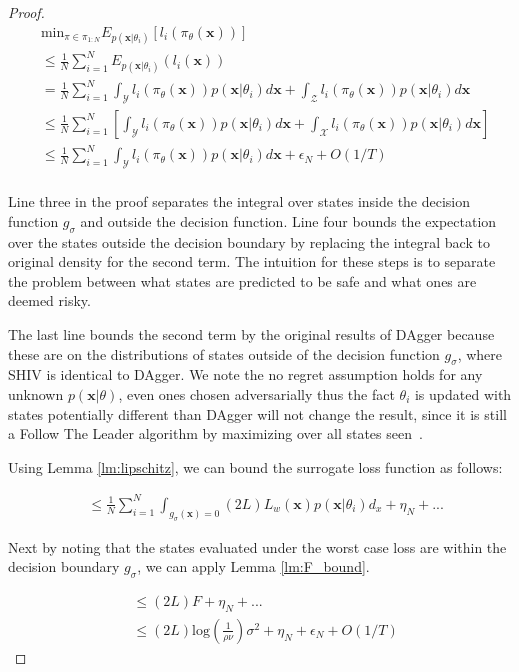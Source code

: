 \documentclass[10pt, conference]{ieeeconf}      %
\newcommand{\bx}{\mathbf{x}}
\begin{document}
\begin{proof}
\begin{align*}
&\mbox{min}_{\pi\in \pi_{1:N}} E_{p(\bx|\theta_i)}[l_i(\pi_\theta(\bx))]\\
&\leq \frac{1}{N} \sum^N_{i=1} E_{p(\bx|\theta_i)}(l_i(\bx))\\
&=\frac{1}{N} \sum^N_{i=1} \int_{\mathcal{Y}} l_i(\pi_\theta(\bx)) p(\bx|\theta_i)d\bx+\int_{\mathcal{Z}}l_i(\pi_\theta(\bx)) p(\bx|\theta_i)d\bx\\
&\leq\frac{1}{N} \sum^N_{i=1}[ \int_{\mathcal{Y}}l_i(\pi_\theta(\bx))p(\bx|\theta_i)d\bx+ \int_{\mathcal{X}} l_i(\pi_\theta(\bx))p(\bx|\theta_i)d\bx]\\
&\leq\frac{1}{N} \sum^N_{i=1} \int_{\mathcal{Y}} l_i(\pi_\theta(\bx))p(\bx|\theta_i)d\bx+  \epsilon_N + O(1/T)\\
\end{align*}

Line three in the proof separates the integral over states inside the decision function $g_{\sigma}$ and outside the decision function. Line four  bounds the expectation over the states outside the decision boundary by replacing the integral back to original density for the second term. The intuition for these steps is to separate the problem between what states are predicted to be safe and what ones are deemed risky. 

The last line bounds the second term by the original results of DAgger because these are on the distributions of states outside of the decision function $g_{\sigma}$, where SHIV is identical to DAgger. We note the no regret assumption holds for any unknown $p(\bx|\theta)$, even ones chosen adversarially thus the fact $\theta_i$ is updated with states potentially different than DAgger will not change the result, since it is still a Follow The Leader algorithm by maximizing over all states seen~\cite{ross2010reduction}. 

Using Lemma \ref{lm:lipschitz}, we can bound the surrogate loss function as follows: 

\begin{align*}
&\leq\frac{1}{N} \sum^N_{i=1} \int_{g_{\sigma}(\bx) =0} (2L)L_w(\bx)p(\bx|\theta_i)d_x+ \eta_N  +...
\end{align*}

Next by noting that the states evaluated under the worst case loss are within the decision boundary $g_{\sigma}$, we can apply Lemma \ref{lm:F_bound}. 

\begin{align*}
&\leq (2L)F+\eta_N +...\\
&\leq  (2L)\mbox{log}(\frac{1}{\rho\nu})\sigma^2+\eta_N+  \epsilon_N + O(1/T)
\end{align*}
\end{proof}
\end{document}
